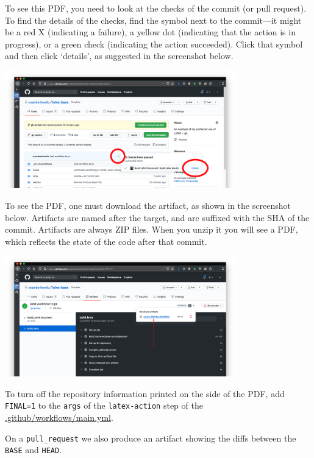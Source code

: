 To see this PDF, you need to look at the checks of the commit (or pull request).
To find the details of the checks, find the symbol next to the commit---it might be a red X (indicating a failure), a yellow dot (indicating that the action is in progress), or a green check (indicating the action succeeded).
Click that symbol and then click `details', as suggested in the screenshot below.
\begin{center}
\includegraphics[width=0.75\textwidth]{figure/github-action-find-details}
\end{center}
To see the PDF, one must download the artifact, as shown in the screenshot below.
Artifacts are named after the target, and are suffixed with the SHA of the commit.
Artifacts are always ZIP files.  When you unzip it you will see a PDF, which reflects the state of the code after that commit.
\begin{center}
\includegraphics[width=0.75\textwidth]{figure/github-action-artifact}
\end{center}
To turn off the repository information printed on the side of the PDF, add \texttt{FINAL=1} to the \texttt{args} of the \texttt{latex-action} step of the \href{https://github.com/evanberkowitz/latex-base/blob/gh-action/.github/workflows/main.yml}{.github/workflows/main.yml}.

On a \texttt{pull\_request} we also produce an artifact showing the diffs between the \texttt{BASE} and \texttt{HEAD}.
